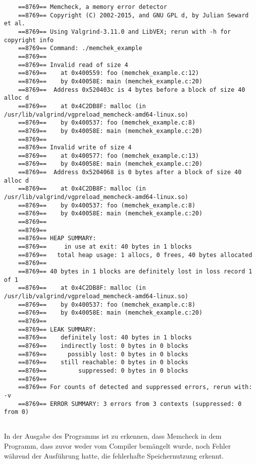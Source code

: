 \begin{lstlisting}
	==8769== Memcheck, a memory error detector
	==8769== Copyright (C) 2002-2015, and GNU GPL d, by Julian Seward et al.
	==8769== Using Valgrind-3.11.0 and LibVEX; rerun with -h for copyright info
	==8769== Command: ./memchek_example
	==8769== 
	==8769== Invalid read of size 4
	==8769==    at 0x400559: foo (memchek_example.c:12)
	==8769==    by 0x40058E: main (memchek_example.c:20)
	==8769==  Address 0x520403c is 4 bytes before a block of size 40 alloc d
	==8769==    at 0x4C2DB8F: malloc (in /usr/lib/valgrind/vgpreload_memcheck-amd64-linux.so)
	==8769==    by 0x400537: foo (memchek_example.c:8)
	==8769==    by 0x40058E: main (memchek_example.c:20)
	==8769== 
	==8769== Invalid write of size 4
	==8769==    at 0x400577: foo (memchek_example.c:13)
	==8769==    by 0x40058E: main (memchek_example.c:20)
	==8769==  Address 0x5204068 is 0 bytes after a block of size 40 alloc d
	==8769==    at 0x4C2DB8F: malloc (in /usr/lib/valgrind/vgpreload_memcheck-amd64-linux.so)
	==8769==    by 0x400537: foo (memchek_example.c:8)
	==8769==    by 0x40058E: main (memchek_example.c:20)
	==8769== 
	==8769== 
	==8769== HEAP SUMMARY:
	==8769==     in use at exit: 40 bytes in 1 blocks
	==8769==   total heap usage: 1 allocs, 0 frees, 40 bytes allocated
	==8769== 
	==8769== 40 bytes in 1 blocks are definitely lost in loss record 1 of 1
	==8769==    at 0x4C2DB8F: malloc (in /usr/lib/valgrind/vgpreload_memcheck-amd64-linux.so)
	==8769==    by 0x400537: foo (memchek_example.c:8)
	==8769==    by 0x40058E: main (memchek_example.c:20)
	==8769== 
	==8769== LEAK SUMMARY:
	==8769==    definitely lost: 40 bytes in 1 blocks
	==8769==    indirectly lost: 0 bytes in 0 blocks
	==8769==      possibly lost: 0 bytes in 0 blocks
	==8769==    still reachable: 0 bytes in 0 blocks
	==8769==         suppressed: 0 bytes in 0 blocks
	==8769== 
	==8769== For counts of detected and suppressed errors, rerun with: -v
	==8769== ERROR SUMMARY: 3 errors from 3 contexts (suppressed: 0 from 0)
	
\end{lstlisting}

In der Ausgabe des Programms ist zu erkennen, dass Memcheck in dem Programm, dass zuvor weder vom Compiler bemängelt wurde, noch Fehler während der Ausführung hatte, die fehlerhafte Speichernutzung erkennt.
